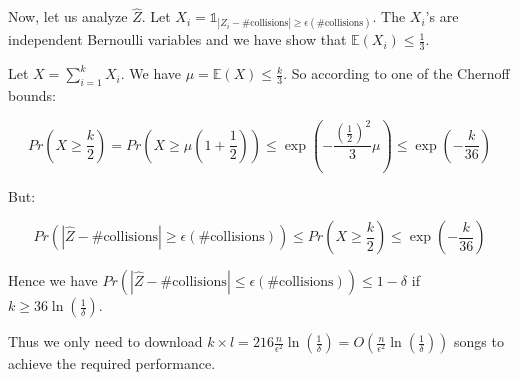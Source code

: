 \documentclass[10pt,a4paper]{article}
\theoremstyle{plain}
\begin{document}
Now, let us analyze $\hat{Z}$. Let $X_i = \mathds{1}_{|Z_i - \text{\# collisions}| \geq \epsilon (\text{\# collisions})}$. The $X_i$'s are independent Bernoulli variables and we have show that $\mathbb{E}(X_i) \leq \frac{1}{3}$.

Let $X = \sum_{i = 1}^k{X_i}$. We have $\mu = \mathbb{E}(X) \leq \frac{k}{3}$. So according to one of the Chernoff bounds:

$$
Pr(X \geq \frac{k}{2}) = Pr(X \geq \mu(1 + \frac{1}{2})) \leq \exp(-\frac{(\frac{1}{2})^2}{3}\mu) \leq \exp(-\frac{k}{36})
$$

But:

$$
Pr(|\hat{Z} - \text{\# collisions}| \geq \epsilon (\text{\# collisions})) \leq Pr(X \geq \frac{k}{2}) \leq \exp(-\frac{k}{36})
$$

Hence we have $Pr(|\hat{Z} - \text{\# collisions}| \leq \epsilon (\text{\# collisions})) \leq 1 - \delta$ if $k \geq 36\ln(\frac{1}{\delta})$.

Thus we only need to download $k \times l = 216\frac{n}{\epsilon^2}\ln(\frac{1}{\delta}) = O(\frac{n}{\epsilon^2}\ln(\frac{1}{\delta}))$ songs to achieve the required performance.
\end{document}
